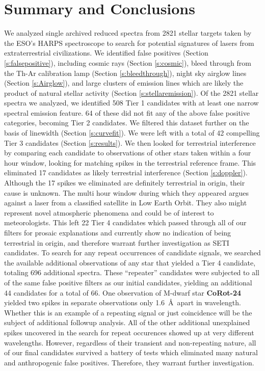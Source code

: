 \documentclass[linenumbers]{aastex701}
\providecommand{\DIFadd}[1]{{\bf #1}} %
\providecommand{\DIFaddbegin}{} %
\providecommand{\DIFaddend}{} %
\begin{document}
\section{Summary and Conclusions}
We analyzed single archived reduced spectra from 2821 stellar targets taken by the ESO’s HARPS spectroscope to search for potential signatures of lasers from extraterrestrial civilizations. We identified false positives (Section \ref{s:falsepositive}), including cosmic rays (Section \ref{s:cosmic}), bleed through from the Th-Ar calibration lamp (Section \ref{s:bleedthrough}), night sky airglow lines (Section \ref{s:Airglow}), and large clusters of emission lines which are likely the product of natural stellar activity (Section \ref{s:stellaremission}). Of the 2821 stellar spectra we analyzed, we identified 508 Tier 1 candidates with at least one narrow spectral emission feature.  64 of these did not fit any of the above false positive categories, becoming Tier 2 candidates. We filtered this dataset further on the basis of linewidth (Section \ref{s:curvefit}). We were left with a total of 42 compelling Tier 3 candidates (Section \ref{s:results}). We then looked for terrestrial interference by comparing each candidate to observations of other stars taken within a four hour window, looking for matching spikes in the terrestrial reference frame.  This eliminated 17 candidates as likely terrestrial interference (Section \ref{s:doppler}). Although the 17 spikes we eliminated are definitely terrestrial in origin, their cause is unknown.  The multi hour window during which they appeared argues against a laser from a classified satellite in Low Earth Orbit. They also might represent novel atmospheric phenomena and could be of interest to meteorologists. This left 22 Tier 4 candidates which passed through all of our filters for prosaic explanations and currently show no indication of being terrestrial in origin, and therefore warrant further investigation as SETI candidates. To search for any repeat occurrences of candidate signals, we searched the available additional observations of any star that yielded a Tier 4 candidate, totaling 696 additional spectra. These  \DIFaddbegin \enquote{repeater} \DIFaddend candidates were subjected to all of the same false positive filters as our initial candidates, yielding an additional 44 candidates for a total of 66. One observation of M-dwarf star  \DIFaddbegin \DIFadd{CoRot-24 }\DIFaddend yielded two spikes in separate observations only 1.6~\AA~apart in wavelength. Whether this is an example of a repeating signal or just coincidence will be the subject of additional followup analysis. All of the other additional unexplained spikes uncovered in the search for repeat occurences showed up at very different wavelengths. However, regardless of their transient and non-repeating nature, all of our final candidates survived a battery of tests which eliminated many natural and anthropogenic false positives. Therefore, they warrant further investigation.
\end{document}
